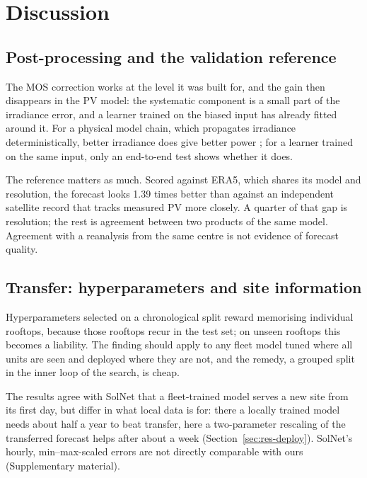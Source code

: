 \section{Discussion}
\label{sec:discussion}

\subsection{Post-processing and the validation reference}
\label{sec:disc-mos}

The MOS correction works at the level it was built for, and the gain then disappears in the PV model: the systematic component is a small part of the irradiance error, and a learner trained on the biased input has already fitted around it. For a physical model chain, which propagates irradiance deterministically, better irradiance does give better power \citep{Mayer2021,Mayer2022}; for a learner trained on the same input, only an end-to-end test shows whether it does.

The reference matters as much. Scored against ERA5, which shares its model and resolution, the forecast looks 1.39 times better than against an independent satellite record that tracks measured PV more closely. A quarter of that gap is resolution; the rest is agreement between two products of the same model. Agreement with a reanalysis from the same centre is not evidence of forecast quality.

\subsection{Transfer: hyperparameters and site information}
\label{sec:disc-transfer}

Hyperparameters selected on a chronological split reward memorising individual rooftops, because those rooftops recur in the test set; on unseen rooftops this becomes a liability. The finding should apply to any fleet model tuned where all units are seen and deployed where they are not, and the remedy, a grouped split in the inner loop of the search, is cheap.

The results agree with SolNet \citep{Depoortere2025} that a fleet-trained model serves a new site from its first day, but differ in what local data is for: there a locally trained model needs about half a year to beat transfer, here a two-parameter rescaling of the transferred forecast helps after about a week (Section~\ref{sec:res-deploy}). SolNet's hourly, min--max-scaled errors are not directly comparable with ours (Supplementary material).

